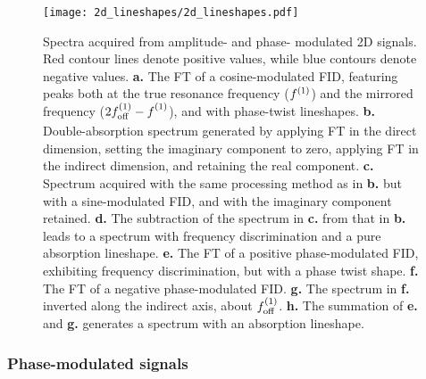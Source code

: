 \begin{figure}
    \centering
    \texttt{[image: 2d\_lineshapes/2d\_lineshapes.pdf]}
    \caption[
        Spectra acquired from amplitude- and phase-modulated \acs{2D} signals.
    ]{
        Spectra acquired from amplitude- and phase- modulated \acs{2D} signals.
        Red contour lines denote positive values, while blue contours denote
        negative values.
        \textbf{a.} The \ac{FT} of a cosine-modulated \ac{FID}, featuring peaks
        both at the true resonance frequency ($f^{(1)}$) and the mirrored
        frequency ($2f_{\mathrm{off}}^{(1)} - f^{(1)}_{\vphantom{off}}$), and with phase-twist lineshapes.
        \textbf{b.} Double-absorption spectrum generated by applying \ac{FT}
        in the direct dimension, setting the imaginary component to zero,
        applying \ac{FT} in the indirect dimension, and retaining the real
        component.
        \textbf{c.} Spectrum acquired with the same processing method as in
        \textbf{b.} but with a sine-modulated \ac{FID}, and with the imaginary
        component retained.
        \textbf{d.} The subtraction of the spectrum in \textbf{c.} from that in
        \textbf{b.} leads to a spectrum with frequency discrimination and a
        pure absorption lineshape.
        \textbf{e.} The \ac{FT} of a positive phase-modulated \ac{FID},
        exhibiting frequency discrimination, but with a phase twist shape.
        \textbf{f.} The \ac{FT} of a negative phase-modulated \ac{FID}.
        \textbf{g.} The spectrum in \textbf{f.} inverted along the indirect
        axis, about $f_{\mathrm{off}}^{(1)}$.
        \textbf{h.} The summation of \textbf{e.} and \textbf{g.} generates a
        spectrum with an absorption lineshape.
    }
    \label{fig:2d-lineshapes}
\end{figure}

\subsubsection{Phase-modulated signals}


